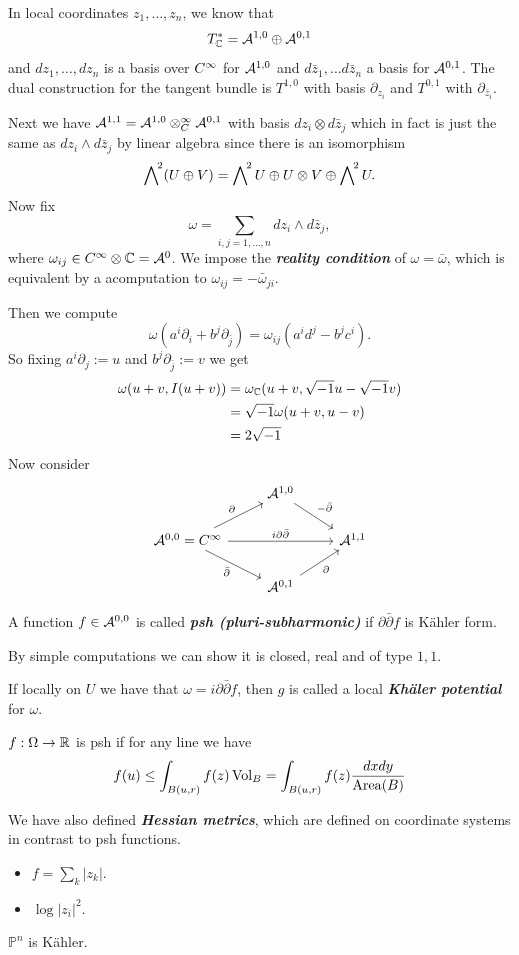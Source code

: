 In local coordinates $z_1,\ldots,z_n$, we know that
\[T^*_{\mathbb{C}}=\mathcal{A}^{1,0}\oplus\mathcal{A}^{0,1}\]
and $dz_1,\ldots, dz_n$ is a basis over $C^\infty$ for $\mathcal{A}^{1,0}$ and $d\bar z_1,\ldots d\bar z_n$ a basis for $\mathcal{A}^{0,1}$. The dual construction for the tangent bundle is $T^{1,0}$ with basis $\partial_{z_i}$ and $T^{0,1}$ with $\partial_{\bar{z}_i}$.

Next we have $\mathcal{A}^{1,1}=\mathcal{A}^{1,0}\otimes_C^\infty\mathcal{A}^{0,1}$ with basis $dz_i\otimes d\bar z_j$ which in fact is just the same as $dz_i\wedge d\bar z_j$ by linear algebra since there is an isomorphism
\[\extp^2(U\oplus V)=\extp^2U\oplus U\otimes V\oplus\extp^2U.\]
 Now fix
\[\omega=\sum_{i,j=1,\ldots, n}dz_i\wedge d\bar z_j,\]
where $\omega_{ij}\in C^\infty\otimes\mathbb{C}=\mathcal{A}^0$. We impose the \textbf{\textit{reality condition}} of $\omega=\bar\omega$, which is equivalent by a acomputation to $\omega_{ij}=-\bar\omega_{ji}$.

Then we compute
\[\omega(a^i\partial_i+b^j\partial_{\bar j})=\omega_{ij}(a^id^j-b^jc^i).\]
So fixing $a^i\partial_j:=u$ and $b^j\partial_{\bar j}:=v$ we get
\begin{align*}
	\omega(u+v,I(u+v))&=\omega_{\mathbb{C}}(u+v,\sqrt{-1}u-\sqrt{-1}v)\\
	&=\sqrt{-1}\omega(u+v,u-v)\\
	&=2\sqrt{-1}
\end{align*}
Now consider
\[\begin{tikzcd}
	&\Ac^{1,0}\arrow[dr,"-\bar\partial"]\\
	\Ac^{0,0}=\Cinf\arrow[rr,"i\partial\bar\partial"]\arrow[ur,"\partial"]\arrow[dr,"\bar\partial",swap]&&\Ac^{1,1}\\
	&\Ac^{0,1}\arrow[ur,"\partial",swap]
\end{tikzcd}\]
\begin{defn}
	A function $f\in\mathcal{A}^{0,0}$ is called \textbf{\textit{psh (pluri-subharmonic)}} if $\partial\bar\partial f$ is Kähler form.
\end{defn}
By simple computations we can show it is closed, real and of type $1,1$.
\begin{defn}
	 If locally on $U$ we have that $\omega=i\partial\bar\partial f$, then $g$ is called a local \textbf{\textit{Khäler potential}} for $\omega$.
\end{defn}
\begin{defn}
	$f:\Omega\to\mathbb{R}$ is psh if for any line we have
	\[f(u)\leq\int_{B(u,r)}f(z)\operatorname{Vol}_B=\int_{B(u,r)}f(z)\frac{dxdy}{\operatorname{Area}(B)}\]
\end{defn}
We have also defined \textbf{\textit{Hessian metrics}}, which are defined on coordinate systems in contrast to psh functions.
\begin{examples}\leavevmode
	\begin{itemize}
		\item $f=\sum_k|z_k|$.
		\item $\log|z_i|^2$.
	\end{itemize}
\end{examples}
\begin{exercise}
	$\mathbb{P}^n$ is Kähler.
\end{exercise}
